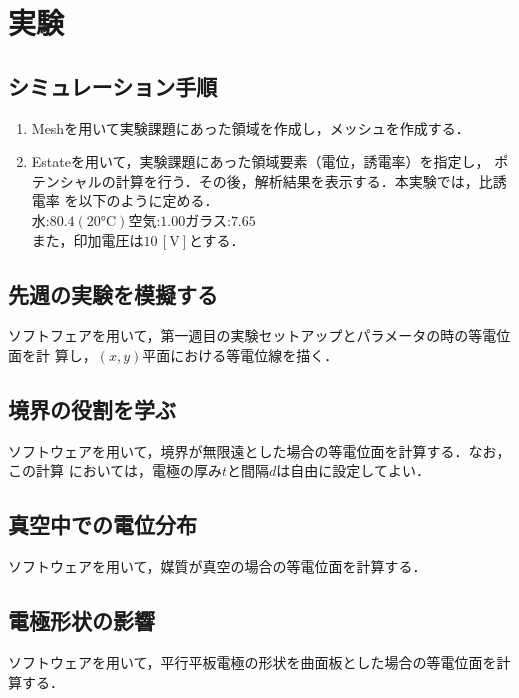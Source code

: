 
\section{実験}

\subsection{シミュレーション手順}
\begin{enumerate}
    \item Meshを用いて実験課題にあった領域を作成し，メッシュを作成する．
    \item Estateを用いて，実験課題にあった領域要素（電位，誘電率）を指定し，
    ポテンシャルの計算を行う．その後，解析結果を表示する．本実験では，比誘電率
    を以下のように定める．\\
    水:$80.4(20\si{\celsius})$\quad 空気:$1.00$\quad ガラス:$7.65$\\
    また，印加電圧は$10\,[\si{\volt}]$とする．
\end{enumerate}

\subsection{先週の実験を模擬する}
ソフトフェアを用いて，第一週目の実験セットアップとパラメータの時の等電位面を計
算し，$(x,y)$平面における等電位線を描く．

\subsection{境界の役割を学ぶ}
ソフトウェアを用いて，境界が無限遠とした場合の等電位面を計算する．なお，この計算
においては，電極の厚み$t$と間隔$d$は自由に設定してよい．

\subsection{真空中での電位分布}
ソフトウェアを用いて，媒質が真空の場合の等電位面を計算する．

\subsection{電極形状の影響}
ソフトウェアを用いて，平行平板電極の形状を曲面板とした場合の等電位面を計算する．
